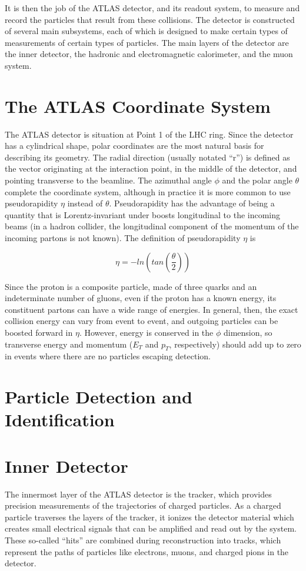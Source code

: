 It is then the job of the ATLAS detector, and its readout system, to measure and record the particles that result from these collisions.  The detector is constructed of several main subsystems, each of which is designed to make certain types of measurements of certain types of particles.  The main layers of the detector are the inner detector, the hadronic and electromagnetic calorimeter, and the muon system.


\section{The ATLAS Coordinate System}
The ATLAS detector is situation at Point 1 of the LHC ring.  Since the detector has a cylindrical shape, polar coordinates are the most natural basis for describing its geometry.  The radial direction (usually notated ``r'') is defined as the vector originating at the interaction point, in the middle of the detector, and pointing transverse to the beamline.  The azimuthal angle $\phi$ and the polar angle $\theta$ complete the coordinate system, although in practice it is more common to use pseudorapidity $\eta$ instead of $\theta$.  Pseudorapidity has the advantage of being a quantity that is Lorentz-invariant under boosts longitudinal to the incoming beams (in a hadron collider, the longitudinal component of the momentum of the incoming partons is not known).  The definition of pseudorapidity $\eta$ is

\begin{equation}
\eta = -ln(tan( \frac{\theta}{2} ))
\end{equation}

Since the proton is a composite particle, made of three quarks and an indeterminate number of gluons, even if the proton has a known energy, its constituent partons can have a wide range of energies.  In general, then, the exact collision energy can vary from event to event, and outgoing particles can be boosted forward in $\eta$.  However, energy is conserved in the $\phi$ dimension, so transverse energy and momentum ($E_T$ and $p_T$, respectively) should add up to zero in events where there are no particles escaping detection.

\section{Particle Detection and Identification}


\section{Inner Detector}
The innermost layer of the ATLAS detector is the tracker, which provides precision measurements of the trajectories of charged particles.  As a charged particle traverses the layers of the tracker, it ionizes the detector material which creates small electrical signals that can be amplified and read out by the system.  These so-called ``hits'' are combined during reconstruction into tracks, which represent the paths of particles like electrons, muons, and charged pions in the detector.


